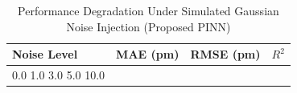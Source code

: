 \begin{table}[h]
\centering
\caption{Performance Degradation Under Simulated Gaussian Noise Injection (Proposed PINN)}
\label{tab:noise_robustness}
\begin{tabular}{lccc}
\hline
\textbf{Noise Level} & \textbf{MAE (pm)} & \textbf{RMSE (pm)} & \textbf{$R^2$} \\ \hline
0.0%
1.0%
3.0%
5.0%
10.0%
\hline
\end{tabular}
\end{table}